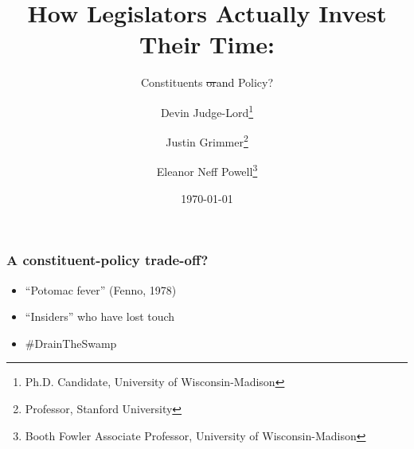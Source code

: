 \documentclass[10pt]{beamer}
\title{How Legislators Actually Invest Their Time:}
\subtitle{Constituents \texorpdfstring{\sout{or}}{or}\textcolor{black}{and} Policy?}
\author{Devin Judge-Lord\thanks{Ph.D. Candidate, University of Wisconsin-Madison}\and Justin Grimmer\thanks{Professor, Stanford University} \and Eleanor Neff Powell\thanks{Booth Fowler Associate Professor, University of Wisconsin-Madison}}
\date{\today}
\begin{document}
\begin{frame}
\maketitle
\end{frame}





\section{} 
\begin{frame} 
\frametitle{A constituent-policy trade-off?}
\huge 
\begin{itemize}
\item ``Potomac fever'' (Fenno, 1978) \pause
\item ``Insiders'' who have lost touch \pause
\item \#DrainTheSwamp
\end{itemize}
\end{frame}
\end{document}
